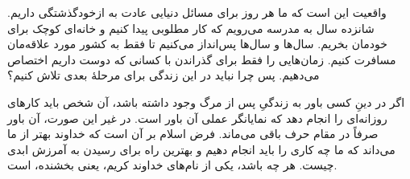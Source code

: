 واقعیت این است که ما هر روز برای مسائل دنیایی عادت به ازخودگذشتگی داریم. شانزده سال به مدرسه می‌رویم که کار مطلوبی پیدا کنیم و خانه‌ای کوچک برای خودمان بخریم. سال‌ها و سال‌ها پس‌انداز می‌کنیم تا فقط به کشور مورد علاقه‌مان مسافرت کنیم. زمان‌هایی را فقط برای گذراندن با کسانی که دوست داریم اختصاص می‌دهیم. پس چرا نباید  در این زندگی برای مرحلهٔ بعدی تلاش کنیم؟

اگر در دینِ کسی باور به زندگیِ پس از مرگ وجود داشته باشد، آن شخص باید کارهای روزانه‌ای را انجام دهد که نمایانگر عملی آن باور است. در غیر این صورت، آن باور صرفاً در مقام حرف باقی می‌ماند. فرض اسلام بر آن است که خداوند بهتر از ما می‌داند که ما  چه کاری را باید انجام دهیم و بهترین راه برای رسیدن به آمرزش ابدی چیست. هر چه باشد، یکی از نام‌های خداوند کریم، یعنی بخشنده، است.  






